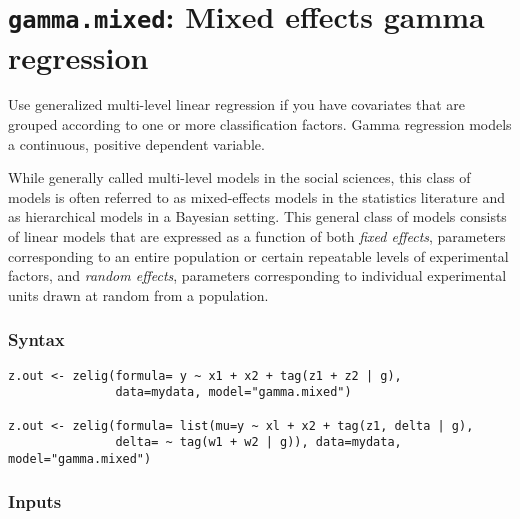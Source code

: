 \section{{\tt gamma.mixed}: Mixed effects gamma regression}
\label{gamma.mixed}

Use generalized multi-level linear regression if you have covariates that are grouped according to one or more classification factors. Gamma regression models a continuous, positive dependent variable.

While generally called multi-level models in the social sciences, this class of models is often referred to as mixed-effects models in the statistics literature and as hierarchical models in a Bayesian setting. This general class of models consists of linear models that are expressed as a function of both \emph{fixed effects}, parameters corresponding to an entire population or certain repeatable levels of experimental factors, and \emph{random effects}, parameters corresponding to individual experimental units drawn at random from a population.

\subsubsection{Syntax}

\begin{verbatim}
z.out <- zelig(formula= y ~ x1 + x2 + tag(z1 + z2 | g),
               data=mydata, model="gamma.mixed")

z.out <- zelig(formula= list(mu=y ~ xl + x2 + tag(z1, delta | g),
               delta= ~ tag(w1 + w2 | g)), data=mydata, model="gamma.mixed")
\end{verbatim}

\subsubsection{Inputs}


